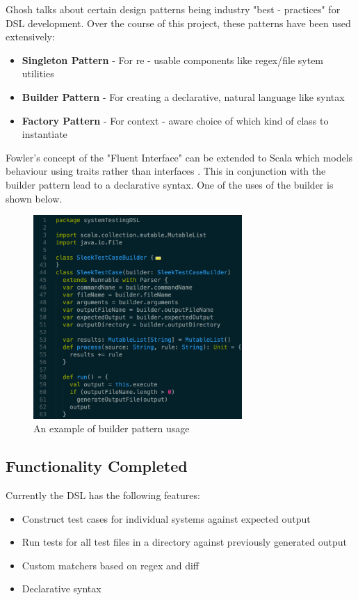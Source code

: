 \documentclass[12 pt]{article}
\begin{document}
Ghosh \cite{dslsInAction} talks about certain design patterns being industry "best - practices" for DSL development. Over the course of this project, these patterns have been used extensively:
\begin{itemize}
\item \textbf{Singleton Pattern} - For re - usable components like regex/file sytem utilities
\item \textbf{Builder Pattern} - For creating a declarative, natural language like syntax
\item \textbf{Factory Pattern} - For context - aware choice of which kind of class to instantiate
\end{itemize}

\noindent
Fowler's concept of the "Fluent Interface" can be extended to Scala which models behaviour using traits rather than interfaces \cite{scala}. This in conjunction with the builder pattern lead to a declarative syntax. One of the uses of the builder is shown below.

\begin{figure}[h!]
  \centering
    \includegraphics[width=300px]{figures/builder_pattern.png}
  \caption{An example of builder pattern usage}
\end{figure}


\subsection{Functionality Completed}
Currently the DSL has the following features:
\begin{itemize}
\item Construct test cases for individual systems against expected output
\item Run tests for all test files in a directory against previously generated output
\item Custom matchers based on regex and diff
\item Declarative syntax
\end{itemize}
\end{document}
